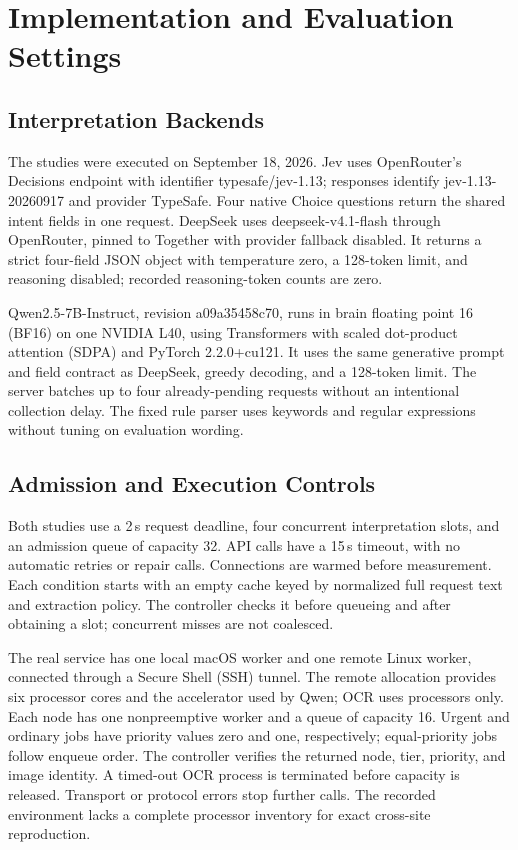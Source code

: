 \appendices
\section{Implementation and Evaluation Settings}
\label{app:settings}
\subsection{Interpretation Backends}
The studies were executed on September 18, 2026. Jev uses OpenRouter's
Decisions endpoint with identifier typesafe/jev-1.13; responses identify
jev-1.13-20260917 and provider TypeSafe. Four native Choice questions return
the shared intent fields in one request. DeepSeek uses deepseek-v4.1-flash
through OpenRouter, pinned to Together with provider fallback disabled.
It returns a strict four-field JSON object with temperature zero, a
128-token limit, and reasoning disabled; recorded reasoning-token counts
are zero.

Qwen2.5-7B-Instruct, revision a09a35458c70, runs in brain floating point 16
(BF16) on one NVIDIA L40, using Transformers with scaled dot-product
attention (SDPA) and PyTorch 2.2.0+cu121. It uses the same generative prompt
and field contract as DeepSeek, greedy decoding, and a 128-token limit.
The server batches up to four already-pending requests without an intentional
collection delay. The fixed rule parser uses keywords and regular expressions
without tuning on evaluation wording.

\subsection{Admission and Execution Controls}
Both studies use a 2\,s request deadline, four concurrent interpretation
slots, and an admission queue of capacity 32. API calls have a 15\,s timeout,
with no automatic retries or repair calls. Connections are warmed before
measurement. Each condition starts with an empty cache keyed by normalized
full request text and extraction policy. The controller checks it before
queueing and after obtaining a slot; concurrent misses are not coalesced.

The real service has one local macOS worker and one remote Linux worker,
connected through a Secure Shell (SSH) tunnel. The remote allocation provides
six processor cores and the accelerator used by Qwen; OCR uses processors
only. Each node has one nonpreemptive worker and a queue of capacity 16.
Urgent and ordinary jobs have priority values zero and one, respectively;
equal-priority jobs follow enqueue order. The controller verifies the returned
node, tier, priority, and image identity. A timed-out OCR process is terminated
before capacity is released. Transport or protocol errors stop further calls.
The recorded environment lacks a complete processor inventory for exact
cross-site reproduction.

